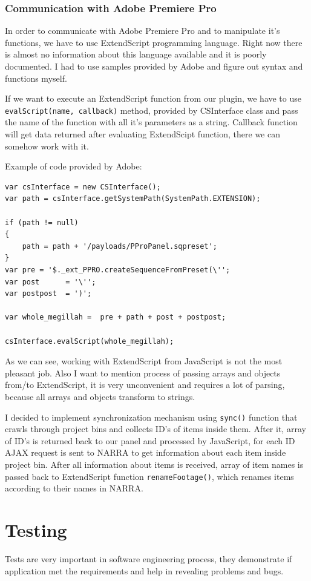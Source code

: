 \documentclass[thesis=B,english]{FITthesis}[2012/10/20]
\begin{document}
\subsection{Communication with Adobe Premiere Pro}
In order to communicate with Adobe Premiere Pro and to manipulate it's functions, we have to use ExtendScript programming language. Right now there is almost no information about this language available and it is poorly documented. I had to use samples provided by Adobe and figure out syntax and functions myself.

If we want to execute an ExtendScript function from our plugin, we have to use \texttt{evalScript(name, callback)} method, provided by CSInterface class and pass the name of the function with all it's parameters as a string. Callback function will get data returned after evaluating ExtendScipt function, there we can somehow work with it.

Example of code provided by Adobe:  
\begin{lstlisting}[caption=Evaluating createSequenceFromPreset function from sample panel, label=lst:lst_eval]
var csInterface = new CSInterface();
var path = csInterface.getSystemPath(SystemPath.EXTENSION);

if (path != null)
{
	path = path + '/payloads/PProPanel.sqpreset';
}
var pre = '$._ext_PPRO.createSequenceFromPreset(\'';
var post      = '\'';
var postpost  = ')';

var whole_megillah =  pre + path + post + postpost;
           	
csInterface.evalScript(whole_megillah);
\end{lstlisting}
As we can see, working with ExtendScript from JavaScript is not the most pleasant job. Also I want to mention process of passing arrays and objects from/to ExtendScript, it is very unconvenient and requires a lot of parsing, because all arrays and objects transform to strings.

I decided to implement synchronization mechanism using \texttt{sync()} function that crawls through project bins and collects ID's of items inside them. After it, array of ID's is returned back to our panel and processed by JavaScript, for each ID AJAX request is sent to NARRA to get information about each item inside project bin. After all information about items is received, array of item names is passed back to ExtendScript function \texttt{renameFootage()}, which renames items according to their names in NARRA.

\chapter{Testing}
Tests are very important in software engineering process, they demonstrate if application met the requirements and help in revealing problems and bugs.
\end{document}
